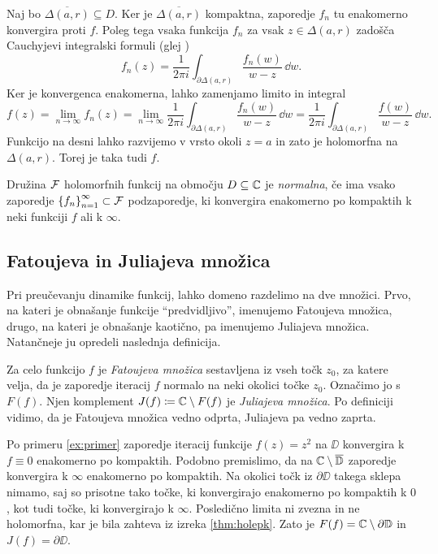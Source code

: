 \begin{dokaz}
    Naj bo \(\overline{\Delta (a, r)} \subseteq D\). Ker je \(\overline{\Delta (a, r)}\) kompaktna, zaporedje \(f_n\) tu enakomerno konvergira proti \(f\). Poleg tega vsaka funkcija \(f_n\) za vsak \(z \in \Delta (a, r)\) zadošča Cauchyjevi integralski formuli (glej \cite[izrek 50]{Globevnik_2010})
    \[f_n (z) = \frac{1}{2 \pi i} \int_{\partial \Delta (a, r)} \frac{f_n (w)}{w - z} \, \dd w.\]
    Ker je konvergenca enakomerna, lahko zamenjamo limito in integral
    \[f (z) = \lim_{n \to \infty} f_n (z) = \lim_{n \to \infty} \frac{1}{2 \pi i} \int_{\partial \Delta (a, r)} \frac{f_n (w)}{w - z} \, \dd w = \frac{1}{2 \pi i} \int_{\partial \Delta (a, r)} \frac{f (w)}{w - z} \, \dd w.\]
    Funkcijo na desni lahko razvijemo v vrsto okoli \(z = a\) in zato je holomorfna na \(\Delta (a, r)\). Torej je taka tudi \(f\).
\end{dokaz}

\begin{definicija}
    Družina \(\mathcal F\) holomorfnih funkcij na območju \(D \subseteq \mathbb C\) je \emph{normalna}, če ima vsako zaporedje \(\left\{ f_n \right\}_{n = 1}^{\infty} \subset \mathcal F\) podzaporedje, ki konvergira enakomerno po kompaktih k neki funkciji \(f\) ali k \(\infty\).
\end{definicija}

\subsection{Fatoujeva in Juliajeva množica}

Pri preučevanju dinamike funkcij, lahko domeno razdelimo na dve množici. Prvo, na kateri je obnašanje funkcije ``predvidljivo'', imenujemo Fatoujeva množica, drugo, na kateri je obnašanje kaotično, pa imenujemo Juliajeva množica. Natančneje ju opredeli naslednja definicija.

Za celo funkcijo \(f\) je \emph{Fatoujeva množica} sestavljena iz vseh točk \(z_0\), za katere velja, da je zaporedje iteracij \(f\) normalo na neki okolici točke \(z_0\). Označimo jo s \(F (f)\). Njen komplement \(J (f) \coloneq \mathbb C \setminus F (f)\) je \emph{Juliajeva množica}. Po definiciji vidimo, da je Fatoujeva množica vedno odprta, Juliajeva pa vedno zaprta.

\begin{primer}
    Po primeru \ref{ex:primer} zaporedje iteracij funkcije \(f (z) = z^2\) na \(\DD\) konvergira k \(f \equiv 0\) enakomerno po kompaktih. Podobno premislimo, da na \(\mathbb C \setminus \overline{\mathbb D}\) zaporedje konvergira k \(\infty\) enakomerno po kompaktih. Na okolici točk iz \(\partial \DD\) takega sklepa nimamo, saj so prisotne tako točke, ki konvergirajo enakomerno po kompaktih k \(0\), kot tudi točke, ki konvergirajo k \(\infty\). Posledično limita ni zvezna in ne holomorfna, kar je bila zahteva iz izreka \ref{thm:holepk}. Zato je \(F (f) = \mathbb C \setminus \partial \mathbb D\) in \(J (f) = \partial \DD\).
\end{primer}


